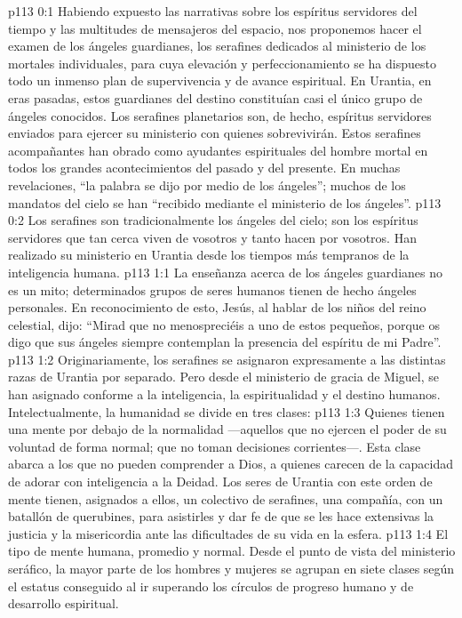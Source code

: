 \author{Jefe de los serafines}
\vs p113 0:1 Habiendo expuesto las narrativas sobre los espíritus servidores del tiempo y las multitudes de mensajeros del espacio, nos proponemos hacer el examen de los ángeles guardianes, los serafines dedicados al ministerio de los mortales individuales, para cuya elevación y perfeccionamiento se ha dispuesto todo un inmenso plan de supervivencia y de avance espiritual. En Urantia, en eras pasadas, estos guardianes del destino constituían casi el único grupo de ángeles conocidos. Los serafines planetarios son, de hecho, espíritus servidores enviados para ejercer su ministerio con quienes sobrevivirán. Estos serafines acompañantes han obrado como ayudantes espirituales del hombre mortal en todos los grandes acontecimientos del pasado y del presente. En muchas revelaciones, “la palabra se dijo por medio de los ángeles”; muchos de los mandatos del cielo se han “recibido mediante el ministerio de los ángeles”.
\vs p113 0:2 Los serafines son tradicionalmente los ángeles del cielo; son los espíritus servidores que tan cerca viven de vosotros y tanto hacen por vosotros. Han realizado su ministerio en Urantia desde los tiempos más tempranos de la inteligencia humana.
\vs p113 1:1 La enseñanza acerca de los ángeles guardianes no es un mito; determinados grupos de seres humanos tienen de hecho ángeles personales. En reconocimiento de esto, Jesús, al hablar de los niños del reino celestial, dijo: “Mirad que no menospreciéis a uno de estos pequeños, porque os digo que sus ángeles siempre contemplan la presencia del espíritu de mi Padre”.
\vs p113 1:2 Originariamente, los serafines se asignaron expresamente a las distintas razas de Urantia por separado. Pero desde el ministerio de gracia de Miguel, se han asignado conforme a la inteligencia, la espiritualidad y el destino humanos. Intelectualmente, la humanidad se divide en tres clases:
\vs p113 1:3 Quienes tienen una mente por debajo de la normalidad ---aquellos que no ejercen el poder de su voluntad de forma normal; que no toman decisiones corrientes---. Esta clase abarca a los que no pueden comprender a Dios, a quienes carecen de la capacidad de adorar con inteligencia a la Deidad. Los seres de Urantia con este orden de mente tienen, asignados a ellos, un colectivo de serafines, una compañía, con un batallón de querubines, para asistirles y dar fe de que se les hace extensivas la justicia y la misericordia ante las dificultades de su vida en la esfera.
\vs p113 1:4 El tipo de mente humana, promedio y normal. Desde el punto de vista del ministerio seráfico, la mayor parte de los hombres y mujeres se agrupan en siete clases según el estatus conseguido al ir superando los círculos de progreso humano y de desarrollo espiritual.

